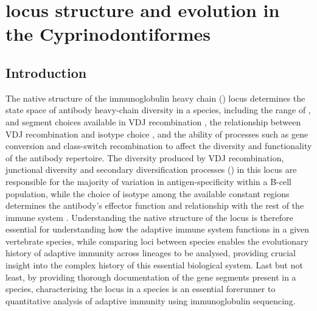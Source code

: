 \chapter{\igh{} locus structure and evolution in the Cyprinodontiformes}  
\label{chap:locus}
\onehalfspacing

\pagebreak

\section{Introduction}

The native structure of the immunoglobulin heavy chain (\igh{}) locus determines the state space of antibody heavy-chain diversity in a species, including the range of \vh, \dh and \jh segment choices available in VDJ recombination \parencite{jung2006vdjr}, the relationship between VDJ recombination and isotype choice \parencite{fillatreau2013astonishing}, and the ability of processes such as gene conversion \parencite{wysocki1989conversion} and class-switch recombination \parencite{magor2015affinity,patel2018aid} to affect the diversity and functionality of the antibody repertoire. The diversity produced by VDJ recombination, junctional diversity and secondary diversification processes () in this locus are responsible for the majority of variation in antigen-specificity within a B-cell population, while the choice of isotype among the available \igh{} constant regions determines the antibody's effector function and relationship with the rest of the immune system \parencite{schroeder2010immunoglobulins}. Understanding the native structure of the \igh{} locus is therefore essential for understanding how the adaptive immune system functions in a given vertebrate species, while comparing loci between species enables the evolutionary history of adaptive immunity across lineages to be analysed, providing crucial insight into the complex history of this essential biological system. Last but not least, by providing thorough documentation of the \igh{} gene segments present in a species, characterising the \igh{} locus in a species is an essential forerunner to quantitative analysis of adaptive immunity using immunoglobulin sequencing.

